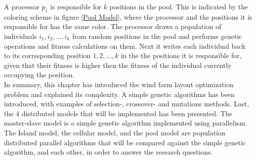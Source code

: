 \noindent A processor $p_1$ is responsible for $k$ positions in the pool. This is indicated by the coloring scheme in figure \ref{Pool Model}, where the processor and the positions it is responsible for has the same color. The processor draws a population of individuals $i_1, i_2,...,i_k$ from random positions in the pool and performs genetic operations and fitness calculations on them. Next it writes each individual back to its corresponding position $1, 2,...,k$ in the the positions it is responsible for, given that their fitness is higher then the fitness of the individual currently occupying the position.\\


\noindent In summary, this chapter has introduced the wind farm layout optimization problem and explained its complexity. A simple genetic algorithms has been introduced, with examples of selection-, crossover- and mutations methods. Last, the 4 distributed models that will be implemented has been presented. The master-slave model is a simple genetic algorithm implemented using parallelism. The Island model, the cellular model, and the pool model are population distributed parallel algorithms that  will be compared against the simple genetic algorithm, and each other, in order to answer the research questions. 
